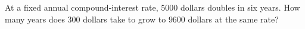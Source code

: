 At a fixed annual compound-interest rate, $5000$ dollars doubles in six years. How many years does $300$ dollars take to grow to $9600$ dollars at the same rate?

